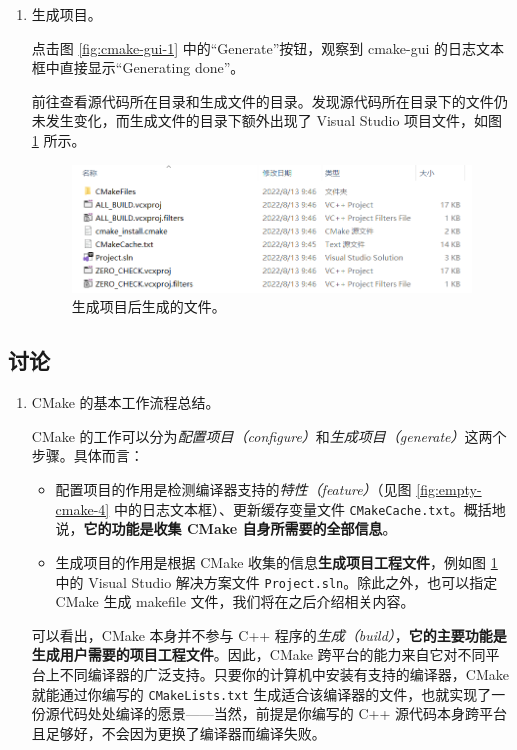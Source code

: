 \begin{enumerate}
	\item 生成项目。

	点击图 \ref{fig:cmake-gui-1} 中的“Generate”按钮，观察到 cmake-gui 的日志文本框中直接显示“Generating done”。

	前往查看源代码所在目录和生成文件的目录。发现源代码所在目录下的文件仍未发生变化，而生成文件的目录下额外出现了 Visual Studio 项目文件，如图 \ref{fig:empty-cmake-6} 所示。

	\begin{figure}[H]
		\centering
		\includegraphics[width=0.9\linewidth]{assets/empty-cmake-6}
		\caption{生成项目后生成的文件。}
		\label{fig:empty-cmake-6}
	\end{figure}
\end{enumerate}

\subsection*{讨论}

\begin{enumerate}
	\item CMake 的基本工作流程总结。

	CMake 的工作可以分为\emph{配置项目（configure）}和\emph{生成项目（generate）}这两个步骤。具体而言：

	\begin{itemize}
		\item 配置项目的作用是检测编译器支持的\emph{特性（feature）}（见图 \ref{fig:empty-cmake-4} 中的日志文本框）、更新缓存变量文件 \lstinline[language={}]{CMakeCache.txt}。概括地说，\textbf{它的功能是收集 CMake 自身所需要的全部信息}。

		\item 生成项目的作用是根据 CMake 收集的信息\textbf{生成项目工程文件}，例如图 \ref{fig:empty-cmake-6} 中的 Visual Studio 解决方案文件 \lstinline[language={}]{Project.sln}。除此之外，也可以指定 CMake 生成 makefile 文件，我们将在之后介绍相关内容。 %
	\end{itemize}

	可以看出，CMake 本身并不参与 C++ 程序的\emph{生成（build）}，\textbf{它的主要功能是生成用户需要的项目工程文件}。因此，CMake 跨平台的能力来自它对不同平台上不同编译器的广泛支持。只要你的计算机中安装有支持的编译器，CMake 就能通过你编写的 \lstinline[language={}]{CMakeLists.txt} 生成适合该编译器的文件，也就实现了一份源代码处处编译的愿景——当然，前提是你编写的 C++ 源代码本身跨平台且足够好，不会因为更换了编译器而编译失败。
\end{enumerate}
